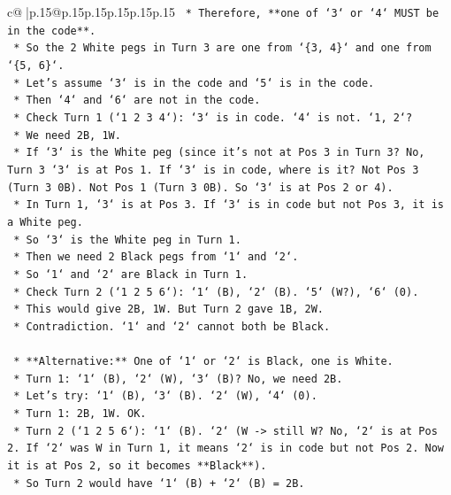 \documentclass{article}
\begin{document}
{\begin{supertabular}{c@{$\;$}|p{.15\linewidth}@{}p{.15\linewidth}p{.15\linewidth}p{.15\linewidth}p{.15\linewidth}p{.15\linewidth}}
{{{\texttt{        *   Therefore, **one of `3` or `4` MUST be in the code**.} \\
\texttt{        *   So the 2 White pegs in Turn 3 are one from `\{3, 4\}` and one from `\{5, 6\}`.} \\
\texttt{        *   Let's assume `3` is in the code and `5` is in the code.} \\
\texttt{        *   Then `4` and `6` are not in the code.} \\
\texttt{        *   Check Turn 1 (`1 2 3 4`): `3` is in code. `4` is not. `1, 2`?} \\
\texttt{            *   We need 2B, 1W.} \\
\texttt{            *   If `3` is the White peg (since it's not at Pos 3 in Turn 3? No, Turn 3 `3` is at Pos 1. If `3` is in code, where is it? Not Pos 3 (Turn 3 0B). Not Pos 1 (Turn 3 0B). So `3` is at Pos 2 or 4).} \\
\texttt{            *   In Turn 1, `3` is at Pos 3. If `3` is in code but not Pos 3, it is a White peg.} \\
\texttt{            *   So `3` is the White peg in Turn 1.} \\
\texttt{            *   Then we need 2 Black pegs from `1` and `2`.} \\
\texttt{            *   So `1` and `2` are Black in Turn 1.} \\
\texttt{            *   Check Turn 2 (`1 2 5 6`): `1` (B), `2` (B). `5` (W?), `6` (0).} \\
\texttt{            *   This would give 2B, 1W. But Turn 2 gave 1B, 2W.} \\
\texttt{            *   Contradiction. `1` and `2` cannot both be Black.} \\
\\ 
\texttt{    *   **Alternative:** One of `1` or `2` is Black, one is White.} \\
\texttt{        *   Turn 1: `1` (B), `2` (W), `3` (B)? No, we need 2B.} \\
\texttt{        *   Let's try: `1` (B), `3` (B). `2` (W), `4` (0).} \\
\texttt{            *   Turn 1: 2B, 1W. OK.} \\
\texttt{            *   Turn 2 (`1 2 5 6`): `1` (B). `2` (W {-}> still W? No, `2` is at Pos 2. If `2` was W in Turn 1, it means `2` is in code but not Pos 2. Now it is at Pos 2, so it becomes **Black**).} \\
\texttt{            *   So Turn 2 would have `1` (B) + `2` (B) = 2B.} \\
}}}
\end{supertabular}}
\end{document}
